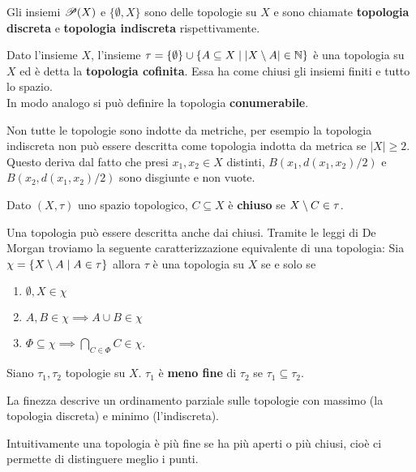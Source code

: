 \begin{multicols*}{2}
\begin{definition}
Gli insiemi $\mathscr{P}(X)$ e $\{\emptyset,X\}$ sono delle topologie su $X$ e sono chiamate \textbf{topologia discreta} e \textbf{topologia indiscreta} rispettivamente.
\end{definition}
\begin{definition}
Dato l'insieme $X$, l'insieme $\tau=\{\emptyset\}\cup\{A\subseteq X\mid |X\setminus A|\in \mathbb{N}\}$ è una topologia su $X$ ed è detta la \textbf{topologia cofinita}. Essa ha come chiusi gli insiemi finiti e tutto lo spazio.\\
In modo analogo si pu\`o definire la topologia \textbf{conumerabile}.
\end{definition}
\begin{remark}
Non tutte le topologie sono indotte da metriche, per esempio la topologia indiscreta non può essere descritta come topologia indotta da metrica se $|X|\geq2$. Questo deriva dal fatto che presi $x_1,x_2\in X$ distinti, $B(x_1,d(x_1,x_2)/2)$ e $B(x_2,d(x_1,x_2)/2)$ sono disgiunte e non vuote.
\end{remark}

\begin{definition}[Chiuso]
Dato $(X,\tau)$ uno spazio topologico, $C\subseteq X$ è \textbf{chiuso} se $X\setminus C\in \tau$.
\end{definition}
\begin{remark}
Una topologia può essere descritta anche dai chiusi. Tramite le leggi di De Morgan troviamo la seguente caratterizzazione equivalente di una topologia: Sia $\chi=\{X\setminus A\mid A\in \tau\}$ allora $\tau$ è una topologia su $X$ se e solo se
\begin{enumerate}[noitemsep]
\item $\emptyset,X\in\chi$
\item $A,B\in\chi\implies A\cup B\in \chi$
\item $\Phi\subseteq \chi\implies \bigcap_{C\in\Phi}C\in \chi$.
\end{enumerate}
\end{remark}


\begin{definition}[Finezza]
Siano $\tau_1,\tau_2$ topologie su $X$. $\tau_1$ è \textbf{meno fine} di $\tau_2$ se $\tau_1\subseteq \tau_2$.
\end{definition}
\begin{remark}
La finezza descrive un ordinamento parziale sulle topologie con massimo (la topologia discreta) e minimo (l'indiscreta).
\end{remark}
\noindent Intuitivamente una topologia è più fine se ha più aperti o più chiusi, cioè ci permette di distinguere meglio i punti.


\end{multicols*}
